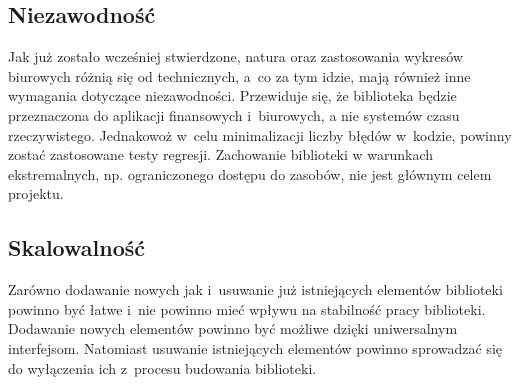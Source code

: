 \subsection{Niezawodność}
Jak już zostało wcześniej stwierdzone, natura oraz zastosowania wykresów biurowych różnią się od technicznych, a~co za tym idzie, mają również inne wymagania dotyczące niezawodności. Przewiduje się, że biblioteka będzie przeznaczona do aplikacji finansowych i~biurowych, a nie systemów czasu rzeczywistego. Jednakowoż w~celu minimalizacji liczby błędów w~kodzie, powinny zostać zastosowane testy regresji. Zachowanie biblioteki w warunkach ekstremalnych, np. ograniczonego dostępu do zasobów, nie jest głównym celem projektu.


\subsection{Skalowalność}
Zarówno dodawanie nowych jak i~usuwanie już istniejących elementów biblioteki powinno być łatwe i~nie powinno mieć wpływu na stabilność pracy biblioteki. Dodawanie nowych elementów powinno być możliwe dzięki uniwersalnym interfejsom. Natomiast usuwanie istniejących elementów powinno sprowadzać się do wyłączenia ich z~procesu budowania biblioteki.
